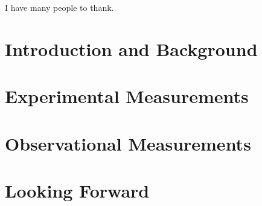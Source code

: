 \documentclass[oldfontcommands]{ucbthesis}
\begin{document}
\begin{frontmatter}



\tableofcontents
\clearpage
\listoffigures
\clearpage
\listoftables

\begin{acknowledgements}
I have many people to thank.
\end{acknowledgements}

\end{frontmatter}

\pagestyle{headings}

\part{Introduction and Background}
\label{par:intro}



\part{Experimental Measurements}
\label{par:experimental}


% 
% 
% 
% 

\part{Observational Measurements}
\label{par:observational}
% 

\part{Looking Forward}
\label{par:conclusion}
% 

% 
% 
\printbibliography

\end{document}
